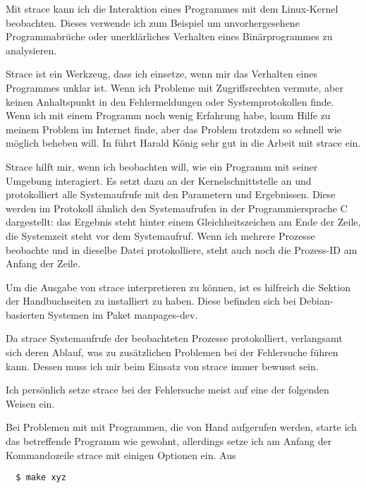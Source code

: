 \begin{abstractsec}
  Mit strace kann ich die Interaktion eines Programmes mit dem Linux-Kernel
  beobachten. Dieses verwende ich zum Beispiel um unvorhergesehene
  Programmabrüche oder unerklärliches Verhalten eines Binärprogrammes zu
  analysieren.
\end{abstractsec}
\begin{normaltext}
  Strace ist ein Werkzeug, dass ich einsetze, wenn mir das Verhalten eines
  Programmes unklar ist. Wenn ich Probleme mit Zugriffsrechten vermute, aber
  keinen Anhaltspunkt in den Fehlermeldungen oder Systemprotokollen finde.
  Wenn ich mit einem Programm noch wenig Erfahrung habe, kaum Hilfe zu meinem
  Problem im Internet finde, aber das Problem trotzdem so schnell wie möglich
  beheben will.
  In \cite{guug:uptimes:2012.1/07} führt Harald König sehr gut in die Arbeit
  mit strace ein.
  
  Strace hilft mir, wenn ich beobachten will, wie ein Programm
  mit seiner Umgebung interagiert. Es setzt dazu an der Kernelschnittstelle
  an und protokolliert alle Systemaufrufe mit den Parametern und Ergebnissen.
  Diese werden im Protokoll ähnlich den Systemaufrufen in der
  Programmiersprache C dargestellt: das Ergebnis steht hinter einem
  Gleichheitszeichen am Ende der Zeile, die Systemzeit steht vor dem
  Systemaufruf. Wenn ich mehrere Prozesse beobachte und in dieselbe Datei
  protokolliere, steht auch noch die Prozess-ID am Anfang der Zeile.

  Um die Ausgabe von strace interpretieren zu können, ist es hilfreich die
  Sektion der Handbuchseiten zu installiert zu haben. Diese befinden sich bei
  Debian-basierten Systemen im Paket manpages-dev.

  Da strace Systemaufrufe der beobachteten Prozesse protokolliert, verlangsamt
  sich deren Ablauf, was zu zusätzlichen Problemen bei der Fehlersuche führen
  kann. Dessen muss ich mir beim Einsatz von strace immer bewusst sein.

  Ich persönlich setze strace bei der Fehlersuche meist auf eine der folgenden
  Weisen ein.

  Bei Problemen mit mit Programmen, die von Hand aufgerufen werden, starte ich
  das betreffende Programm wie gewohnt, allerdings setze ich am Anfang der
  Kommandozeile strace mit einigen Optionen ein. Aus

  \begin{verbatim}
  $ make xyz
  \end{verbatim}


\end{normaltext}
